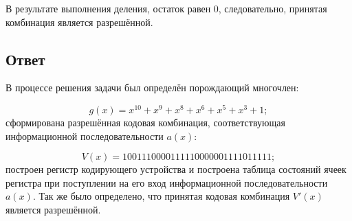 В результате выполнения деления, остаток равен 0, следовательно,
принятая комбинация является разрешённой.

\subsection{Ответ}

В процессе решения задачи был определён порождающий многочлен:

\begin{equation*}
g(x) = x^{10} + x^9 + x^8 + x^6 + x^5 + x^3 + 1;
\end{equation*}
сформирована разрешённая кодовая комбинация, соответствующая
информационной последовательности $a(x)$:

\begin{equation*}
V(x) = 1001110000111110000001111011111;
\end{equation*}
построен регистр кодирующего устройства и построена таблица состояний
ячеек регистра при поступлении на его вход информационной
последовательности $a(x)$. Так же было определено, что принятая кодовая
комбинация $V'(x)$ является разрешённой.



